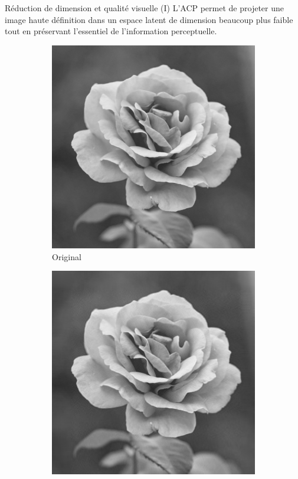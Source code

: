 \documentclass{beamer}
\begin{document}
\begin{frame}{Réduction de dimension et qualité visuelle (I)}
L’ACP permet de projeter une image haute définition dans un espace latent de dimension beaucoup plus faible tout en préservant l’essentiel de l’information perceptuelle.

\begin{figure}
  \centering
  \begin{subfigure}{0.18\textwidth}
    \includegraphics[width=\linewidth]{images/original.png}
    \caption*{Original}
  \end{subfigure}\hfill
  \begin{subfigure}{0.18\textwidth}
    \includegraphics[width=\linewidth]{images/pca_100.png}

\end{subfigure}
\end{figure}
\end{frame}
\end{document}
